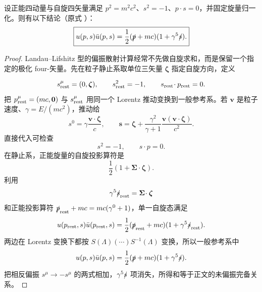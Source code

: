 \begin{proposition}
设正能四动量与自旋四矢量满足 $p^2=m^2c^2$、$s^2=-1$、$p\cdot s=0$，并固定旋量归一化。则有以下结论（原式 ）：
\begin{equation*}
 \boxed{
 u(p,s)\bar u(p,s)
 =\frac12(\slashed p+mc)(1+\gamma^5\slashed s).}
\end{equation*}
\end{proposition}
\begin{proof}
Landau--Lifshitz 型的偏振散射计算经常不先做自旋求和，而是保留一个指定的极化 four-矢量。先在粒子静止系取单位三矢量 $\boldsymbol\zeta$ 指定自旋方向，定义

\begin{equation*}
 s_{\rm rest}^\mu=(0,\boldsymbol\zeta),
 \qquad
 s_{\rm rest}^2=-1,
 \qquad
 s_{\rm rest}\!\cdot p_{\rm rest}=0.
\end{equation*}
把 $p_{\rm rest}^\mu=(mc,\mathbf0)$ 与 $s_{\rm rest}^\mu$ 用同一个 Lorentz 推动变换到一般参考系。若 $\mathbf v$ 是粒子速度、$\gamma=E/(mc^2)$，推动给
\begin{equation*}
 {
 s^0=\gamma\frac{\mathbf v\!\cdot\boldsymbol\zeta}{c},
 \qquad
 \mathbf s
 =\boldsymbol\zeta
 +\frac{\gamma^2}{\gamma+1}
 \frac{\mathbf v(\mathbf v\!\cdot\boldsymbol\zeta)}{c^2}.}
 \end{equation*}
直接代入可检查
\begin{equation*}
 s^2=-1,
 \qquad
 s\!\cdot p=0.
\end{equation*}
在静止系，正能旋量的自旋投影算符是
\begin{equation*}
 \frac12(1+\boldsymbol\Sigma\!\cdot\boldsymbol\zeta).
\end{equation*}
利用
\begin{equation*}
 \gamma^5\slashed s_{\rm rest}
 =\boldsymbol\Sigma\!\cdot\boldsymbol\zeta
\end{equation*}
和正能投影算符 $\slashed p_{\rm rest}+mc=mc(\gamma^0+1)$，单一自旋态满足
\begin{equation*}
 u(p_{\rm rest},s)\bar u(p_{\rm rest},s)
 =\frac12(\slashed p_{\rm rest}+mc)
 (1+\gamma^5\slashed s_{\rm rest}).
\end{equation*}
两边在 Lorentz 变换下都按 $S(\Lambda)(\cdots)S^{-1}(\Lambda)$ 变换，所以一般参考系中
\begin{equation*}
 {
 u(p,s)\bar u(p,s)
 =\frac12(\slashed p+mc)(1+\gamma^5\slashed s).}
 \end{equation*}
把相反偏振 $s^\mu\to-s^\mu$ 的两式相加，$\gamma^5\slashed s$ 项消失，所得和等于正文的未偏振完备关系。
\end{proof}

